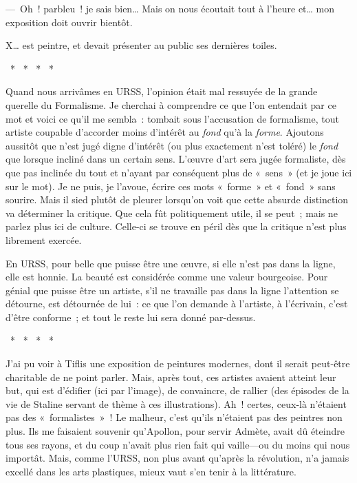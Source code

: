 \documentclass[french,twoside]{book} %
\begin{document}
— Oh ! parbleu ! je sais bien… Mais on nous écoutait tout à l’heure et… mon exposition doit ouvrir bientôt.\par
X… est peintre, et devait présenter au public ses dernières toiles.\par
{\centering \noindent *  *  *  *  *\par}
\noindent Quand nous arrivâmes en URSS, l’opinion était mal ressuyée de la grande querelle du Formalisme. Je cherchai à comprendre ce que l’on entendait par ce mot et voici ce qu’il me sembla : tombait sous l’accusation de formalisme, tout artiste coupable d’accorder moins d’intérêt au \emph{fond} qu’à la \emph{forme}. Ajoutons aussitôt que n’est jugé digne d’intérêt (ou plus exactement n’est toléré) le \emph{fond} que lorsque incliné dans un certain sens. L’œuvre d’art sera jugée formaliste, dès que pas inclinée du tout et n’ayant par conséquent plus de « sens » (et je joue ici sur le mot). Je ne puis, je l’avoue, écrire ces mots « forme » et « fond » sans sourire. Mais il sied plutôt de pleurer lorsqu’on voit que cette absurde distinction va déterminer la critique. Que cela fût politiquement utile, il se peut ; mais ne parlez plus ici de culture. Celle-ci se trouve en péril dès que la critique n’est plus librement exercée.\par
En URSS, pour belle que puisse être une œuvre, si elle n’est pas dans la ligne, elle est honnie. La beauté est considérée comme une valeur bourgeoise. Pour génial que puisse être un artiste, s’il ne travaille pas dans la ligne l’attention se détourne, est détournée de lui : ce que l’on demande à l’artiste, à l’écrivain, c’est d’être conforme ; et tout le reste lui sera donné par-dessus.\par
{\centering \noindent *  *  *  *  *\par}
\noindent J’ai pu voir à Tiflis une exposition de peintures modernes, dont il serait peut-être charitable de ne point parler. Mais, après tout, ces artistes avaient atteint leur but, qui est d’édifier (ici par l’image), de convaincre, de rallier (des épisodes de la vie de Staline servant de thème à ces illustrations). Ah ! certes, ceux-là n’étaient pas des « formalistes » ! Le malheur, c’est qu’ils n’étaient pas des peintres non plus. Ils me faisaient souvenir qu’Apollon, pour servir Admète, avait dû éteindre tous ses rayons, et du coup n’avait plus rien fait qui vaille—ou du moins qui nous importât. Mais, comme l’URSS, non plus avant qu’après la révolution, n’a jamais excellé dans les arts plastiques, mieux vaut s’en tenir à la littérature.\par
\end{document}
